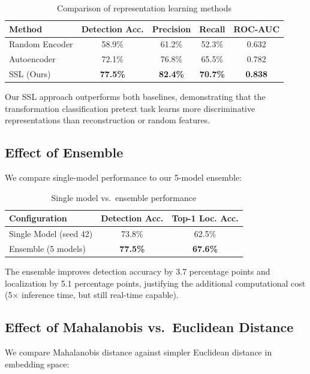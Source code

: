 \begin{table}[htbp]
\centering
\caption{Comparison of representation learning methods}
\label{tab:ablation_ssl}
\begin{tabular}{@{}lcccc@{}}
\toprule
Method & Detection Acc. & Precision & Recall & ROC-AUC \\
\midrule
Random Encoder & 58.9\% & 61.2\% & 52.3\% & 0.632 \\
Autoencoder & 72.1\% & 76.8\% & 65.5\% & 0.782 \\
SSL (Ours) & \textbf{77.5\%} & \textbf{82.4\%} & \textbf{70.7\%} & \textbf{0.838} \\
\bottomrule
\end{tabular}
\end{table}

Our SSL approach outperforms both baselines, demonstrating that the transformation classification pretext task learns more discriminative representations than reconstruction or random features.

\subsection{Effect of Ensemble}

We compare single-model performance to our 5-model ensemble:

\begin{table}[htbp]
\centering
\caption{Single model vs.\ ensemble performance}
\label{tab:ablation_ensemble}
\begin{tabular}{@{}lcc@{}}
\toprule
Configuration & Detection Acc. & Top-1 Loc. Acc. \\
\midrule
Single Model (seed 42) & 73.8\% & 62.5\% \\
Ensemble (5 models) & \textbf{77.5\%} & \textbf{67.6\%} \\
\bottomrule
\end{tabular}
\end{table}

The ensemble improves detection accuracy by 3.7 percentage points and localization by 5.1 percentage points, justifying the additional computational cost (5× inference time, but still real-time capable).

\subsection{Effect of Mahalanobis vs.\ Euclidean Distance}

We compare Mahalanobis distance against simpler Euclidean distance in embedding space:

